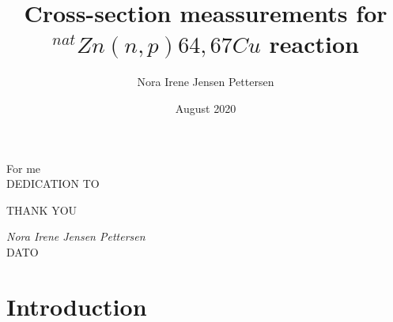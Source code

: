 \documentclass[twoside,english]{uiofysmaster/uiofysmaster}
\author{Nora Irene Jensen Pettersen}
\title{Cross-section meassurements for  $^{nat}Zn(n,p)64,67Cu$ reaction
}
\date{August 2020}
\begin{document}
\setlength{\belowdisplayskip}{12pt} \setlength{\belowdisplayshortskip}{12pt}
\setlength{\abovedisplayskip}{12pt} \setlength{\abovedisplayshortskip}{12pt}

\maketitle


\begin{abstract}




\end{abstract}

\begin{dedication}
  For me
  \\\vspace{12pt}
  DEDICATION TO
    
  
\end{dedication}



\begin{acknowledgements}
THANK YOU

  \vspace{1.5cm}
  
  \noindent\textit{Nora Irene Jensen Pettersen}\\
  
  \noindent DATO
  
\end{acknowledgements}

\tableofcontents



\chapter{Introduction}
\end{document}
